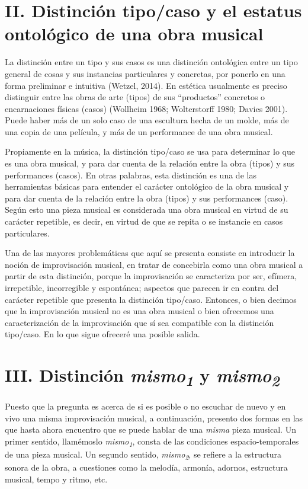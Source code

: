 \documentclass[]{book}
\begin{document}
\begin{refsection}
\section*{II. Distinción tipo/caso y el estatus ontológico de una obra
  musical}


La distinción entre un tipo y sus casos es una distinción ontológica
entre un tipo general de cosas y sus instancias particulares y
concretas, por ponerlo en una forma preliminar e intuitiva (Wetzel,
2014). En estética usualmente es preciso distinguir entre las obras de
arte (tipos) de sus ``productos'' concretos o encarnaciones físicas
(casos) (Wollheim 1968; Wolterstorff 1980; Davies 2001). Puede haber más
de un solo caso de una escultura hecha de un molde, más de una copia de
una película, y más de un performance de una obra musical.

Propiamente en la música, la distinción tipo/caso se usa para determinar
lo que es una obra musical, y para dar cuenta de la relación entre la
obra (tipos) y sus performances (casos). En otras palabras, esta
distinción es una de las herramientas básicas para entender el carácter
ontológico de la obra musical y para dar cuenta de la relación entre la
obra (tipos) y sus performances (caso). Según esto una pieza musical es
considerada una obra musical en virtud de su carácter repetible, es
decir, en virtud de que se repita o se instancie en casos particulares.

Una de las mayores problemáticas que aquí se presenta consiste en
introducir la noción de improvisación musical, en tratar de concebirla
como una obra musical a partir de esta distinción, porque la
improvisación se caracteriza por ser, efímera, irrepetible, incorregible
y espontánea; aspectos que parecen ir en contra del carácter repetible
que presenta la distinción tipo/caso. Entonces, o bien decimos que la
improvisación musical no es una obra musical o bien ofrecemos una
caracterización de la improvisación que sí sea compatible con la
distinción tipo/caso. En lo que sigue ofreceré una posible salida.

\section*{III. Distinción \emph{mismo\textsubscript{1}} y
  \emph{mismo\textsubscript{2}}}


Puesto que la pregunta es acerca de si es posible o no escuchar de nuevo
y en vivo una misma improvisación musical, a continuación, presento dos
formas en las que hasta ahora encuentro que se puede hablar de una
\emph{misma} pieza musical. Un primer sentido, llamémoslo
\emph{mismo\textsubscript{1}}, consta de las condiciones
espacio-temporales de una pieza musical. Un segundo sentido,
\emph{mismo\textsubscript{2}}, se refiere a la estructura sonora de la
obra, a cuestiones como la melodía, armonía, adornos, estructura
musical, tempo y ritmo, etc.


\end{refsection}
\end{document}
